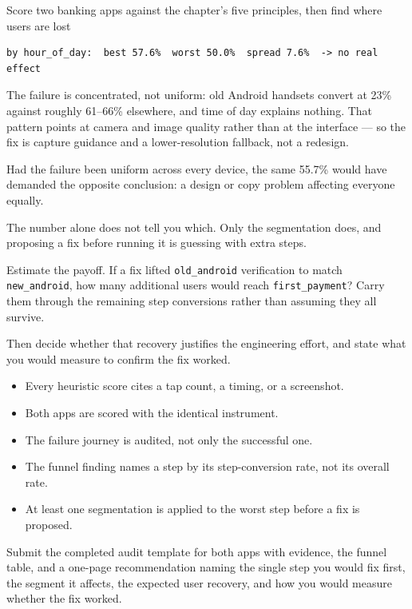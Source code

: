 \begin{labproject}{Score two banking apps against the chapter's five principles, then find where users are lost}
\begin{lstlisting}[style=utpterminal]
by hour_of_day:  best 57.6%  worst 50.0%  spread 7.6%  -> no real effect
\end{lstlisting}

The failure is concentrated, not uniform: old Android handsets convert at 23\% against roughly 61--66\% elsewhere, and time of day explains nothing. That pattern points at camera and image quality rather than at the interface --- so the fix is capture guidance and a lower-resolution fallback, not a redesign.

\begin{pitfall}
Had the failure been uniform across every device, the same 55.7\% would have demanded the opposite conclusion: a design or copy problem affecting everyone equally.

The number alone does not tell you which. Only the segmentation does, and proposing a fix before running it is guessing with extra steps.
\end{pitfall}

\begin{tryit}
Estimate the payoff. If a fix lifted \texttt{old\_android} verification to match \texttt{new\_android}, how many additional users would reach \texttt{first\_payment}? Carry them through the remaining step conversions rather than assuming they all survive.

Then decide whether that recovery justifies the engineering effort, and state what you would measure to confirm the fix worked.
\end{tryit}
\end{labproject}

\begin{verification}
\begin{itemize}
  \item Every heuristic score cites a tap count, a timing, or a screenshot.
  \item Both apps are scored with the identical instrument.
  \item The failure journey is audited, not only the successful one.
  \item The funnel finding names a step by its step-conversion rate, not its overall rate.
  \item At least one segmentation is applied to the worst step before a fix is proposed.
\end{itemize}
\end{verification}

\begin{labdeliverable}
Submit the completed audit template for both apps with evidence, the funnel table, and a one-page recommendation naming the single step you would fix first, the segment it affects, the expected user recovery, and how you would measure whether the fix worked.
\end{labdeliverable}
